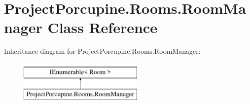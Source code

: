 \hypertarget{class_project_porcupine_1_1_rooms_1_1_room_manager}{}\section{Project\+Porcupine.\+Rooms.\+Room\+Manager Class Reference}
\label{class_project_porcupine_1_1_rooms_1_1_room_manager}
Inheritance diagram for Project\+Porcupine.\+Rooms.\+Room\+Manager\+:\begin{figure}[H]
\begin{center}
\leavevmode
\includegraphics[height=2.000000cm]{class_project_porcupine_1_1_rooms_1_1_room_manager}
\end{center}
\end{figure}
